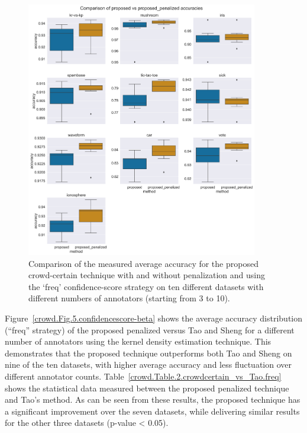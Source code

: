\documentclass[pdflatex,bst/sn-basic]{bst/sn-jnl}%
\begin{document}
\begin{figure}[!htbp]
    \centering
    \includegraphics[width=0.9\textwidth]{figures/image4.png}
    \caption{Comparison of the measured average accuracy for the proposed crowd-certain technique with and without penalization and using the `freq' confidence-score strategy on ten different datasets with different numbers of annotators (starting from 3 to 10).}
    \label{crowd.Fig.4.confidence_score.freq}
\end{figure}

Figure~\ref{crowd.Fig.5.confidencescore-beta} shows the average accuracy distribution (``freq'' strategy) of the proposed penalized versus Tao and Sheng for a different number of annotators using the kernel density estimation technique. This demonstrates that the proposed technique outperforms both Tao and Sheng on nine of the ten datasets, with higher average accuracy and less fluctuation over different annotator counts. Table~\ref{crowd.Table.2.crowdcertain_vs_Tao.freq}  shows the statistical data measured between the proposed penalized technique and Tao's method. As can be seen from these results, the proposed technique has a significant improvement over the seven datasets, while delivering similar results for the other three datasets (p-value < 0.05).
\end{document}
